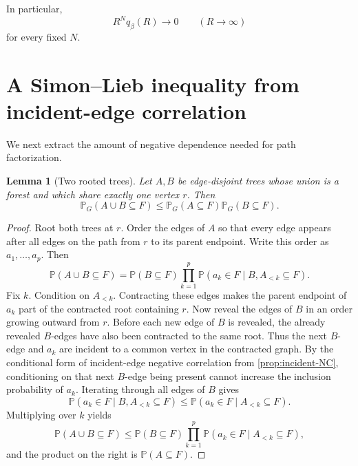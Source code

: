 \documentclass[11pt]{article}
\newtheorem{lemma}[theorem]{Lemma}
\theoremstyle{definition}
\theoremstyle{remark}
\newcommand{\PP}{\mathbb P}
\newcommand{\1}{\mathbf 1}
\begin{document}
In particular,
\begin{equation}\label{eq:q-times-R}
 R^Nq_\beta(R)\longrightarrow0
 \qquad(R\to\infty)
\end{equation}
for every fixed $N$.

\section{A Simon--Lieb inequality from incident-edge correlation}\label{sec:SL}

We next extract the amount of negative dependence needed for path factorization.

\begin{lemma}[Two rooted trees]\label{lem:two-trees}
Let $A,B$ be edge-disjoint trees whose union is a forest and which share exactly one
vertex $r$.  Then
\begin{equation}\label{eq:tree-product}
 \PP_G(A\cup B\subseteq F)
 \le \PP_G(A\subseteq F)\PP_G(B\subseteq F).
\end{equation}
\end{lemma}

\begin{proof}
Root both trees at $r$.  Order the edges of $A$ so that every edge appears after all
edges on the path from $r$ to its parent endpoint.  Write this order as
$a_1,\dots,a_p$.  Then
\begin{equation}
 \PP(A\cup B\subseteq F)
 =\PP(B\subseteq F)
 \prod_{k=1}^p
 \PP(a_k\in F\mid B,A_{<k}\subseteq F).
\end{equation}
Fix $k$.  Condition on $A_{<k}$.  Contracting these edges makes the parent endpoint of
$a_k$ part of the contracted root containing $r$.  Now reveal the edges of $B$ in an
order growing outward from $r$.  Before each new edge of $B$ is revealed, the already
revealed $B$-edges have also been contracted to the same root.  Thus the next
$B$-edge and $a_k$ are incident to a common vertex in the contracted graph.
By the conditional form of incident-edge negative correlation from
\cref{prop:incident-NC}, conditioning on that next $B$-edge being present cannot
increase the inclusion probability of $a_k$.  Iterating through all edges of $B$ gives
\begin{equation}
 \PP(a_k\in F\mid B,A_{<k}\subseteq F)
 \le \PP(a_k\in F\mid A_{<k}\subseteq F).
\end{equation}
Multiplying over $k$ yields
\begin{equation}
 \PP(A\cup B\subseteq F)
 \le \PP(B\subseteq F)
 \prod_{k=1}^p\PP(a_k\in F\mid A_{<k}\subseteq F),
\end{equation}
and the product on the right is $\PP(A\subseteq F)$.
\end{proof}
\end{document}
